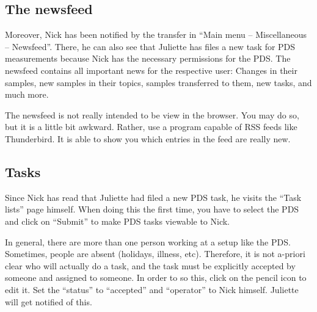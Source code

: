 \documentclass[a4paper,11pt,english]{sphinxmanual}
\begin{document}

\subsection{The newsfeed}
\label{demo:index-17}\label{demo:the-newsfeed}
Moreover, Nick has been notified by the transfer in “Main menu – Miscellaneous
– Newsfeed”.  There, he can also see that Juliette has files a new task for PDS
measurements because Nick has the necessary permissions for the PDS.  The
newsfeed contains all important news for the respective user: Changes in their
samples, new samples in their topics, samples transferred to them, new tasks,
and much more.

The newsfeed is not really intended to be view in the browser.  You may do so,
but it is a little bit awkward.  Rather, use a program capable of RSS feeds
like Thunderbird.  It is able to show you which entries in the feed are really
new.


\subsection{Tasks}
\label{demo:tasks}\label{demo:index-18}
{\hfill{}}

Since Nick has read that Juliette had filed a new PDS task, he visits the “Task
lists” page himself.  When doing this the first time, you have to select the
PDS and click on “Submit” to make PDS tasks viewable to Nick.

In general, there are more than one person working at a setup like the PDS.
Sometimes, people are absent (holidays, illness, etc).  Therefore, it is not
a-priori clear who will actually do a task, and the task must be explicitly
accepted by someone and assigned to someone.  In order to so this, click on the
pencil icon to edit it.  Set the “status” to “accepted” and “operator” to Nick
himself.  Juliette will get notified of this.
\end{document}
